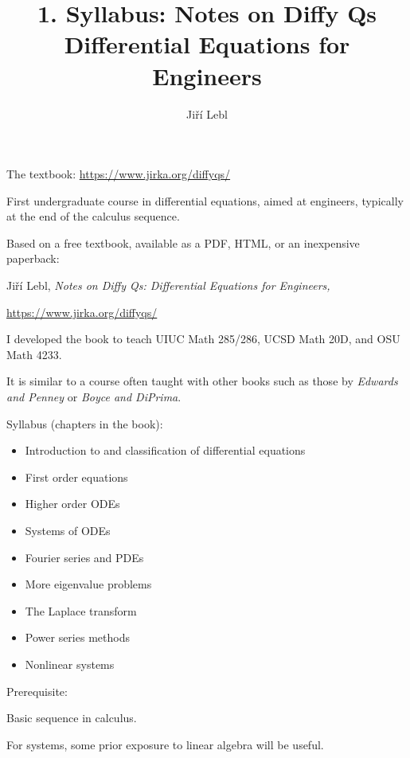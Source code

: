 \documentclass[10pt,aspectratio=169]{beamer}
\author{Ji\v{r}\'i Lebl}
\institute[OSU]{%
Oklahoma State University%
}
\title{1. Syllabus: Notes on Diffy Qs\\Differential Equations for Engineers}
\date{}
\begin{document}
\begin{frame}
\titlepage


\begin{center}
The textbook: \url{https://www.jirka.org/diffyqs/}
\end{center}
\end{frame}

\begin{frame}
First undergraduate course in differential equations, aimed at engineers,
typically at the end of the calculus sequence.

\pause
\medskip

Based on a free textbook, available as a PDF, HTML, or an inexpensive
paperback:

\medskip

Ji\v{r}\'i Lebl, \emph{Notes on Diffy Qs: Differential Equations for Engineers,}

\url{https://www.jirka.org/diffyqs/}

\pause
\medskip

I developed the book
to teach UIUC Math 285/286, UCSD Math 20D, and OSU Math 4233.

\pause
\medskip

It is similar to a course often taught with other books such as
those by
\emph{Edwards and Penney} or \emph{Boyce and DiPrima}.

\end{frame}

\begin{frame}
Syllabus (chapters in the book):

\begin{itemize}
\item\pause
Introduction to and classification of differential equations
\item\pause
First order equations
\item\pause
Higher order ODEs
\item\pause
Systems of ODEs
\item\pause
Fourier series and PDEs
\item\pause
More eigenvalue problems
\item\pause
The Laplace transform
\item\pause
Power series methods
\item\pause
Nonlinear systems
\end{itemize}
\end{frame}

\begin{frame}
Prerequisite:

\medskip

Basic sequence in calculus.

\medskip

For systems, some prior exposure to linear algebra will be useful.

\end{frame}
\end{document}
